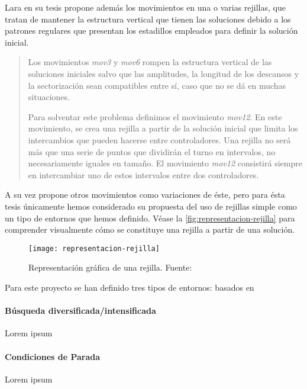 Lara en su tesis propone además los movimientos en una o varias rejillas, que tratan de mantener la estructura vertical que tienen las soluciones debido a los patrones regulares que presentan los estadillos empleados para definir la solución inicial. 

\begin{quotation}
	
	Los movimientos \textit{mov3} y \textit{mov6} rompen la estructura vertical de las soluciones
	iniciales salvo que las amplitudes, la longitud de los descansos y la sectorización sean
	compatibles entre sí, caso que no se dá en muchas situaciones.
	
	Para solventar este problema definimos el movimiento \textit{mov12}. En este movimiento,
	se crea una rejilla a partir de la solución inicial que limita los intercambios
	que pueden hacerse entre controladores. Una rejilla no será más que una serie de
	puntos que dividirán el turno en intervalos, no necesariamente iguales en tamaño. El
	movimiento \textit{mov12} consistirá siempre en intercambiar uno de estos intervalos entre
	dos controladores.
\end{quotation}

A su vez propone otros movimientos como variaciones de éste, pero para ésta tesis únicamente hemos considerado su propuesta del uso de rejillas simple como un tipo de entornos que hemos definido. Véase la \autoref{fig:representacion-rejilla} para comprender visualmente cómo se constituye una rejilla a partir de una solución.

\begin{figure}
	\centering
	\texttt{[image: representacion-rejilla]}
	\caption[Representación gráfica de una rejilla]{Representación gráfica de una rejilla. Fuente:~\cite{tesis-jonatan}}
	\label{fig:representacion-rejilla}
\end{figure}






Para este proyecto se han definido tres tipos de entornos: basados en 

\paragraph{Búsqueda diversificada/intensificada} \label{capitulo:3:busqueda-divers-intens}
Lorem ipsum

\paragraph{Condiciones de Parada}
\label{apartado:condiciones-parada}
Lorem ipsum










